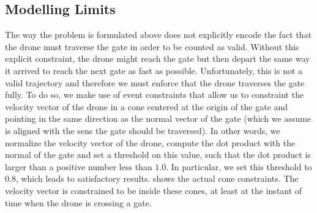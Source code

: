 \subsection{Modelling Limits}
The way the problem is formulated above does not explicitly encode the fact that the drone must traverse the gate in order to be counted as valid.
Without this explicit constraint, the drone might reach the gate but then depart the same way it arrived to reach the next gate as fast as possible.
Unfortunately, this is not a valid trajectory and therefore we must enforce that the drone traverses the gate fully.
To do so, we make use of event constraints that allow us to constraint the velocity vector of the drone in a cone centered at the origin of the gate and pointing in the same direction as the normal vector of the gate (which we assume is aligned with the sens the gate should be traversed).
In other words, we normalize the velocity vector of the drone, compute the dot product with the normal of the gate and set a threshold on this value, such that the dot product is larger than a positive number less than $1.0$.
In particular, we set this threshold to $0.8$, which leads to satisfactory results.
 shows the actual cone constraints. The velocity vector is constrained to be inside these cones, at least at the instant of time when the drone is crossing a gate.